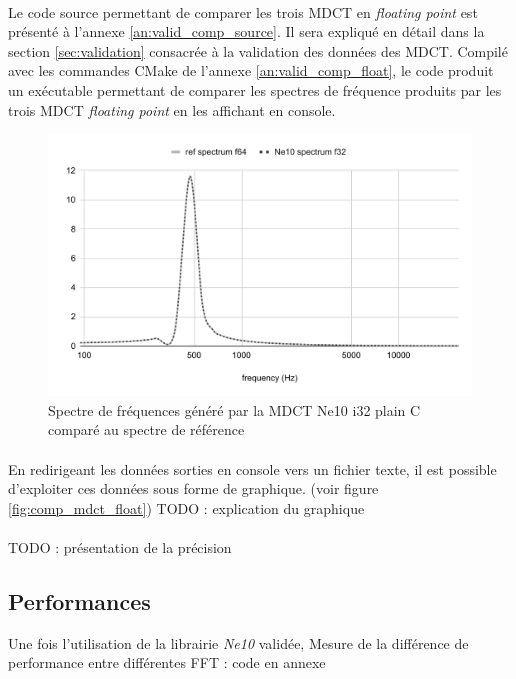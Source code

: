 \documentclass{article}
\begin{document}
    \paragraph{}
    Le code source permettant de comparer les trois MDCT en \emph{floating point} est présenté à l'annexe \ref{an:valid_comp_source}. Il sera expliqué en détail dans la section \ref{sec:validation} consacrée à la validation des données des MDCT. Compilé avec les commandes CMake de l'annexe \ref{an:valid_comp_float}, le code produit un exécutable permettant de comparer les spectres de fréquence produits par les trois MDCT \emph{floating point} en les affichant en console.

    \begin{figure}[H]
        \centering
        \includegraphics[width=.8\linewidth]{./images/validation_ne10_f32.pdf}
        \caption{Spectre de fréquences généré par la MDCT Ne10 i32 plain C comparé au spectre de référence}
        \label{fig:validation_ne10_f32}
    \end{figure}

    \paragraph{}
    En redirigeant les données sorties en console vers un fichier texte, il est possible d'exploiter ces données sous forme de graphique. (voir figure \ref{fig:comp_mdct_float}) TODO : explication du graphique

    \paragraph{}
    TODO : présentation de la précision

    \subsection{Performances}
    \label{sec:fft_perfs}
    Une fois l'utilisation de la librairie \emph{Ne10} validée,  Mesure de la différence de performance entre différentes FFT : code en annexe
\end{document}
